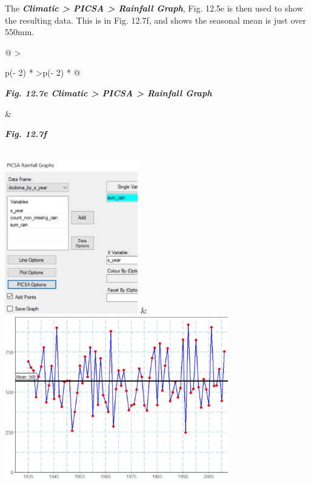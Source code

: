 \documentclass[
  letterpaper,
  DIV=11,
  numbers=noendperiod]{scrreprt}
\begin{document}
The \textbf{\emph{Climatic \textgreater{} PICSA \textgreater{} Rainfall
Graph}}, Fig. 12.5e is then used to show the resulting data. This is in
Fig. 12.7f, and shows the seasonal mean is just over 550mm.

\begin{longtable}[]{@{}
  >{\raggedright\arraybackslash}p{(\columnwidth - 2\tabcolsep) * }
  >{\centering\arraybackslash}p{(\columnwidth - 2\tabcolsep) * }@{}}
\toprule\noalign{}
\begin{minipage}[b]{\linewidth}\raggedright
\textbf{\emph{Fig. 12.7e Climatic \textgreater{} PICSA \textgreater{}
Rainfall Graph}}
\end{minipage} & \begin{minipage}[b]{\linewidth}\centering
\textbf{\emph{Fig. 12.7f}}
\end{minipage} \\
\midrule\noalign{}
\endhead
\bottomrule\noalign{}
\endlastfoot
\includegraphics[width=2.28306in,height=2.63028in]{figures/Fig12.7e.png}
&
\includegraphics[width=3.83075in,height=2.82404in]{figures/Fig12.7f.png} \\
\end{longtable}
\end{document}
